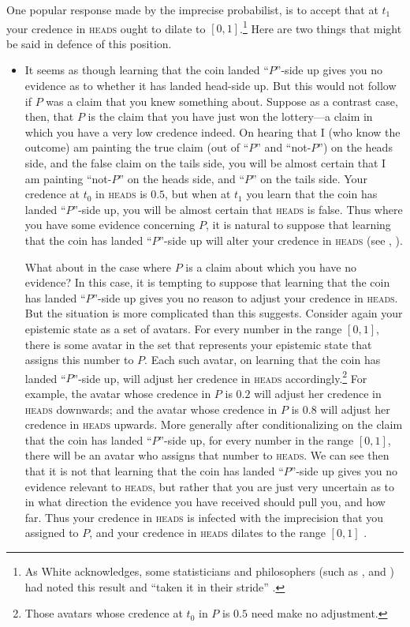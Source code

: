 One popular response made by the imprecise probabilist, is to accept that at $t_1$ your credence in \textsc{heads} ought to dilate to $[0,1]$.\footnote{As White acknowledges, some statisticians and philosophers (such as \citealp{walley1991}, and \citealp{SeidenfeldWasserman1993}) had noted this result and ``taken it in their stride'' \citep[p. 177]{White2009}.} Here are two things that might be said in defence of this position. 

\begin{itemize}
  \item It seems as though learning that the coin landed ``$P$''-side up gives you no evidence as to whether it has landed head-side up. But this would not follow if $P$ was a claim that you knew something about. Suppose as a contrast case, then, that $P$ is the claim that you have just won the lottery---a claim in which you have a very low credence indeed. On hearing that I (who know the outcome) am painting the true claim (out of ``$P$'' and ``not-$P$'') on the heads side, and the false claim on the tails side, you will be almost certain that I am painting ``not-$P$'' on the heads side, and ``$P$'' on the tails side. Your credence at $t_0$ in \textsc{heads} is $0.5$, but when at $t_1$ you learn that the coin has landed ``$P$''-side up, you will be almost certain that \textsc{heads} is false. Thus where you have some evidence concerning $P$, it is natural to suppose that learning that the coin has landed ``$P$''-side up will alter your credence in \textsc{heads} (see \citealp{sturgeon2010}, \citealp{Joyce2010}). 

What about in the case where $P$ is a claim about which you have no evidence? In this case, it is tempting to suppose that learning that the coin has landed ``$P$''-side up gives you no reason to adjust your credence in \textsc{heads}. But the situation is more complicated than this suggests. Consider again your epistemic state as a set of avatars. For every number in the range $[0,1]$, there is some avatar in the set that represents your epistemic state that assigns this number to $P$. Each such avatar, on learning that the coin has landed ``$P$''-side up, will adjust her credence in \textsc{heads} accordingly.\footnote{Those avatars whose credence at $t_0$ in $P$ is $0.5$ need make no adjustment.}  For example, the avatar whose credence in $P$ is $0.2$ will adjust her credence in \textsc{heads} downwards; and the avatar whose credence in $P$ is $0.8$ will adjust her credence in \textsc{heads} upwards. More generally after conditionalizing on the claim that the coin has landed ``$P$''-side up, for every number in the range $[0,1]$, there will be an avatar who assigns that number to \textsc{heads}. We can see then that it is not that learning that the coin has landed ``$P$''-side up gives you no evidence relevant to \textsc{heads}, but rather that you are just very uncertain as to in what direction the evidence you have received should pull you, and how far. Thus your credence in \textsc{heads} is infected with the imprecision that you assigned to $P$, and your credence in \textsc{heads} dilates to the range $[0,1]$ \citep{Joyce2010}.


\end{itemize}
